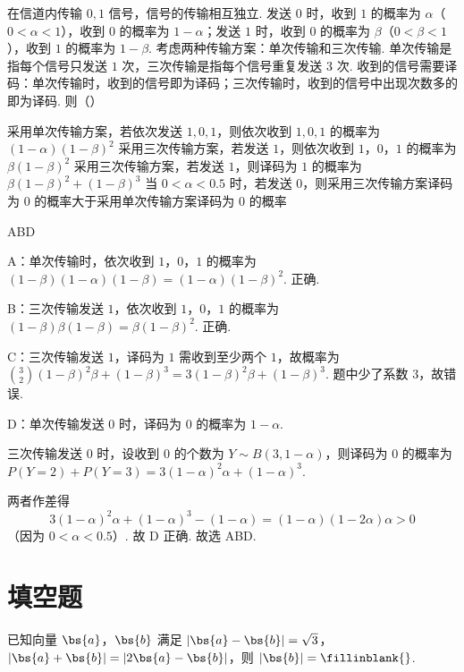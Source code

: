 \begin{problem}
在信道内传输 \(0,1\) 信号，信号的传输相互独立. 发送 \(0\) 时，收到 \(1\) 的概率为 \(\alpha\)（\(0<\alpha<1\)），收到 \(0\) 的概率为 \(1-\alpha\)；发送 \(1\) 时，收到 \(0\) 的概率为 \(\beta\)（\(0<\beta<1\)），收到 \(1\) 的概率为 \(1-\beta\). 考虑两种传输方案：单次传输和三次传输. 单次传输是指每个信号只发送 \(1\) 次，三次传输是指每个信号重复发送 \(3\) 次. 收到的信号需要译码：单次传输时，收到的信号即为译码；三次传输时，收到的信号中出现次数多的即为译码. 则（\quad）

\choices
    {采用单次传输方案，若依次发送 \(1,0,1\)，则依次收到 \(1,0,1\) 的概率为 \((1-\alpha)(1-\beta)^2\)}
    {采用三次传输方案，若发送 \(1\)，则依次收到 \(1\)，\(0\)，\(1\) 的概率为 \(\beta(1-\beta)^2\)}
    {采用三次传输方案，若发送 \(1\)，则译码为 \(1\) 的概率为 \(\beta(1-\beta)^2+(1-\beta)^3\)}
    {当 \(0<\alpha<0.5\) 时，若发送 \(0\)，则采用三次传输方案译码为 \(0\) 的概率大于采用单次传输方案译码为 \(0\) 的概率}
\end{problem}

\begin{answer}
ABD
\end{answer}

\begin{solution}
A：单次传输时，依次收到 \(1\)，\(0\)，\(1\) 的概率为 \((1-\beta)(1-\alpha)(1-\beta)=(1-\alpha)(1-\beta)^2\). 正确.

B：三次传输发送 \(1\)，依次收到 \(1\)，\(0\)，\(1\) 的概率为 \((1-\beta)\beta(1-\beta)=\beta(1-\beta)^2\). 正确.

C：三次传输发送 \(1\)，译码为 \(1\) 需收到至少两个 \(1\)，故概率为
\(\binom32(1-\beta)^2\beta+(1-\beta)^3=3(1-\beta)^2\beta+(1-\beta)^3\). 题中少了系数 \(3\)，故错误.

D：单次传输发送 \(0\) 时，译码为 \(0\) 的概率为 \(1-\alpha\).

三次传输发送 \(0\) 时，设收到 \(0\) 的个数为 \(Y\sim B(3,1-\alpha)\)，则译码为 \(0\) 的概率为 \(P(Y=2)+P(Y=3)=3(1-\alpha)^2\alpha+(1-\alpha)^3\).

两者作差得
\[
3(1-\alpha)^2\alpha+(1-\alpha)^3-(1-\alpha)=(1-\alpha)(1-2\alpha)\alpha>0
\]
（因为 \(0<\alpha<0.5\)）.
故 D 正确. 故选 ABD.
\end{solution}
\section{填空题}

\begin{problem}
已知向量 \(\bs{a}\)，\(\bs{b}\) 满足 \(|\bs{a}-\bs{b}|=\sqrt3\)，\(|\bs{a}+\bs{b}|=|2\bs{a}-\bs{b}|\)，则 \(|\bs{b}|=\fillinblank{}\).
\end{problem}

